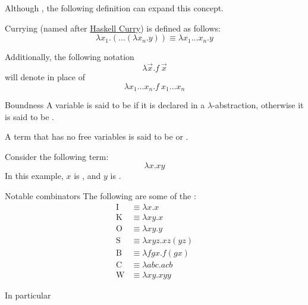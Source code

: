 \documentclass[a4paper, 12pt]{report}
\begin{document}
    Although , the following definition can expand this concept.

    \begin{frameddefn}{Currying}
         (named after \href{https://en.wikipedia.org/wiki/Haskell_Curry}{Haskell Curry}) is defined as follows: $$\lambda x_1.(\ldots (\lambda x_n. y)) \equiv \lambda x_1 \ldots x_n . y$$
    \end{frameddefn}

    Additionally, the following notation $$\lambda \vec x . f \ \vec x$$ will denote  in place of $$\lambda x_1 \ldots x_n . f \ x_1 \ldots x_n$$

    \begin{frameddefn}{Boundness}
        A variable is said to be  if it is declared in a $\lambda$-abstraction, otherwise it is said to be .

        A term that has no free variables is said to be  or .
    \end{frameddefn}

    \begin{example}[Boundness]
        Consider the following term: $$\lambda x.xy$$ In this example, $x$ is , and $y$ is .
    \end{example}

    \begin{frameddefn}[label={not_comb}]{Notable combinators}
        The following are some of the :
        \begin{equation*}
            \begin{split}
                \mathrm I &\equiv \lambda x.x \\
                \mathrm K &\equiv \lambda xy.x \\
                \mathrm O &\equiv \lambda xy.y \\
                \mathrm S &\equiv \lambda xyz.xz(yz) \\
                \mathrm B &\equiv \lambda fgx.f(gx) \\
                \mathrm C &\equiv \lambda abc.acb \\
                \mathrm W &\equiv \lambda xy.xyy
            \end{split}
        \end{equation*}
    \end{frameddefn}

    In particular
    
\end{document}
